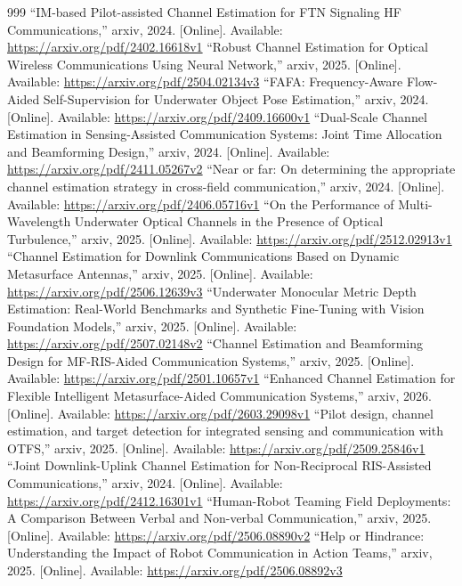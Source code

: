\documentclass[10pt,journal]{IEEEtran}
\begin{document}
\begin{thebibliography}{999}
 ``IM-based Pilot-assisted Channel Estimation for FTN Signaling HF Communications,'' arxiv, 2024. [Online]. Available: \url{https://arxiv.org/pdf/2402.16618v1}
 ``Robust Channel Estimation for Optical Wireless Communications Using Neural Network,'' arxiv, 2025. [Online]. Available: \url{https://arxiv.org/pdf/2504.02134v3}
 ``FAFA: Frequency-Aware Flow-Aided Self-Supervision for Underwater Object Pose Estimation,'' arxiv, 2024. [Online]. Available: \url{https://arxiv.org/pdf/2409.16600v1}
 ``Dual-Scale Channel Estimation in Sensing-Assisted Communication Systems: Joint Time Allocation and Beamforming Design,'' arxiv, 2024. [Online]. Available: \url{https://arxiv.org/pdf/2411.05267v2}
 ``Near or far: On determining the appropriate channel estimation strategy in cross-field communication,'' arxiv, 2024. [Online]. Available: \url{https://arxiv.org/pdf/2406.05716v1}
 ``On the Performance of Multi-Wavelength Underwater Optical Channels in the Presence of Optical Turbulence,'' arxiv, 2025. [Online]. Available: \url{https://arxiv.org/pdf/2512.02913v1}
 ``Channel Estimation for Downlink Communications Based on Dynamic Metasurface Antennas,'' arxiv, 2025. [Online]. Available: \url{https://arxiv.org/pdf/2506.12639v3}
 ``Underwater Monocular Metric Depth Estimation: Real-World Benchmarks and Synthetic Fine-Tuning with Vision Foundation Models,'' arxiv, 2025. [Online]. Available: \url{https://arxiv.org/pdf/2507.02148v2}
 ``Channel Estimation and Beamforming Design for MF-RIS-Aided Communication Systems,'' arxiv, 2025. [Online]. Available: \url{https://arxiv.org/pdf/2501.10657v1}
 ``Enhanced Channel Estimation for Flexible Intelligent Metasurface-Aided Communication Systems,'' arxiv, 2026. [Online]. Available: \url{https://arxiv.org/pdf/2603.29098v1}
 ``Pilot design, channel estimation, and target detection for integrated sensing and communication with OTFS,'' arxiv, 2025. [Online]. Available: \url{https://arxiv.org/pdf/2509.25846v1}
 ``Joint Downlink-Uplink Channel Estimation for Non-Reciprocal RIS-Assisted Communications,'' arxiv, 2024. [Online]. Available: \url{https://arxiv.org/pdf/2412.16301v1}
 ``Human-Robot Teaming Field Deployments: A Comparison Between Verbal and Non-verbal Communication,'' arxiv, 2025. [Online]. Available: \url{https://arxiv.org/pdf/2506.08890v2}
 ``Help or Hindrance: Understanding the Impact of Robot Communication in Action Teams,'' arxiv, 2025. [Online]. Available: \url{https://arxiv.org/pdf/2506.08892v3}

\end{thebibliography}
\end{document}
